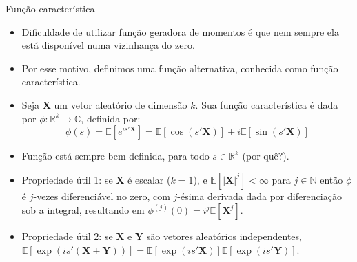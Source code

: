 \documentclass[11pt]{beamer}
\begin{document}
	\begin{frame}{Função característica}
		\begin{itemize}
			\item Dificuldade de utilizar função geradora de momentos é que nem sempre ela está disponível numa vizinhança do zero.
			\item Por esse motivo, definimos uma função alternativa, conhecida como {\color{red}função característica}. 
			\item Seja $\boldsymbol{X}$ um vetor aleatório de dimensão $k$. Sua função característica é dada por $\phi: \mathbb{R}^k \mapsto \mathbb{C}$, definida por:
			\begin{equation*}
				\phi(s) = \mathbb{E}[e^{is'\boldsymbol{X}}] = \mathbb{E}[\cos(s'\boldsymbol{X})] + i \mathbb{E}[\sin(s'\boldsymbol{X})]
			\end{equation*} 
			\item Função está sempre bem-definida, para todo $s \in \mathbb{R}^k$ (por quê?).
			\item {\color{blue}Propriedade útil 1:} se $\boldsymbol{X}$ é escalar ($k=1$), e $\mathbb{E}[|\boldsymbol{X}|^j]<\infty$ para $j \in \mathbb{N}$ então $\phi$ é $j$-vezes diferenciável no zero, com $j$-ésima derivada dada por diferenciação sob a integral, resultando em $\phi^{(j)}(0) = i^j \mathbb{E}[\boldsymbol{X}^j]$.
			\item {\color{blue}Propriedade útil 2:} se $\boldsymbol{X}$ e $\boldsymbol{Y}$ são vetores aleatórios independentes, $\mathbb{E}[\exp(is'(\boldsymbol{X}+\boldsymbol{Y}))] = \mathbb{E}[\exp(is'\boldsymbol{X})] \mathbb{E}[\exp(is'\boldsymbol{Y})]$. 
		\end{itemize}
	\end{frame}
	
\end{document}
